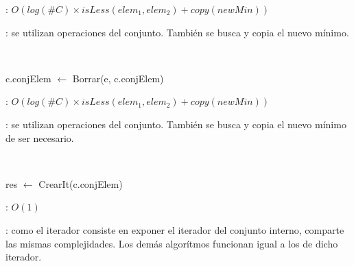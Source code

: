 \begin{Algoritmos}
	\complejidad: $O(log(\#C) \times isLess(elem_1, elem_2) + copy(newMin))$

	\justifcomp: se utilizan operaciones del conjunto. También se busca y copia el nuevo mínimo.

	~

	\begin{algorithm}[H]
		\NoCaptionOfAlgo
		\caption{}
		c.conjElem $\leftarrow$ Borrar(e, c.conjElem)
	\end{algorithm}

	\complejidad: $O(log(\#C) \times isLess(elem_1, elem_2) + copy(newMin))$

	\justifcomp: se utilizan operaciones del conjunto. También se busca y copia el nuevo mínimo de ser necesario.

	~


	\begin{algorithm}[H]
		\NoCaptionOfAlgo
		\caption{}
		res $\leftarrow$ CrearIt(c.conjElem)
	\end{algorithm}

	\complejidad: $O(1)$

	\justifcomp: como el iterador consiste en exponer el iterador del conjunto interno, comparte las mismas complejidades. Los demás algorítmos funcionan igual a los de dicho iterador.

\end{Algoritmos}